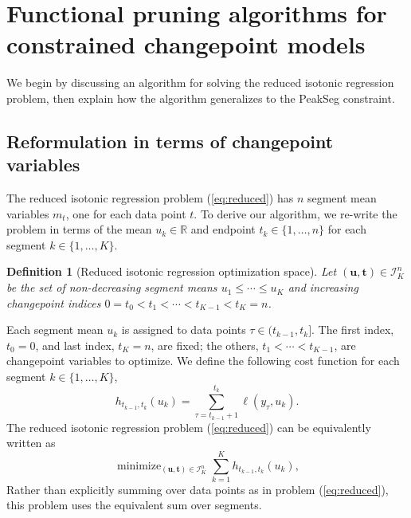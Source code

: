 \documentclass[aoas]{imsart}
\newtheorem{definition}{Definition}
\DeclareMathOperator*{\minimize}{minimize}
\newcommand{\RR}{\mathbb R}
\begin{document}
\newcommand{\FCC}{C}
\newcommand{\M}{\mathcal{M}}
\section{Functional 
pruning algorithms for constrained
  changepoint models}
\label{sec:algorithms}



We begin by discussing an algorithm for solving the reduced isotonic
regression problem, then explain how the algorithm generalizes to
the PeakSeg constraint.

\subsection{Reformulation in terms of changepoint variables}

The reduced isotonic regression problem (\ref{eq:reduced}) has $n$
segment mean variables $m_t$, one for each data point $t$. To derive
our algorithm, we re-write the problem in terms of the mean
$u_k\in\RR$ and endpoint $t_k\in\{1,\dots,n\}$ for each
segment $k\in\{1,\dots, K\}$.
\begin{definition}[Reduced isotonic regression optimization space]
\label{def:Ibar}
  Let $(\mathbf u, \mathbf t)\in{\mathcal I}^n_K$ be the set of
  non-decreasing segment means $u_1\leq\cdots\leq u_K$ and
  increasing changepoint indices $0=t_0<t_1<\cdots<t_{K-1}<t_K=n$.
\end{definition}
Each segment mean $u_k$ is assigned to data points
$\tau\in(t_{k-1},t_k]$. The first index, $t_0=0$, and last index,
$t_K=n$, are fixed; the others, $t_1<\cdots<t_{K-1}$, are
changepoint variables to optimize. We define the following cost function for each
segment $k\in\{1, \dots, K\}$,
\begin{equation}
  \label{eq:h}
  h_{t_{k-1}, t_k}(u_k) = \sum_{\tau=t_{k-1}+1}^{t_k} \ell(y_\tau, u_k).
\end{equation}
The reduced isotonic regression problem (\ref{eq:reduced}) can be equivalently written as
\begin{equation}
  \label{eq:isotonic_ut}
  \minimize_{(\mathbf u, \mathbf t)\in{\mathcal I}^n_K}
  \sum_{k=1}^K
  h_{t_{k-1}, t_k}(u_k),
\end{equation}
Rather than explicitly summing over data points as in problem
(\ref{eq:reduced}), this problem uses the equivalent sum over segments. 
\end{document}
